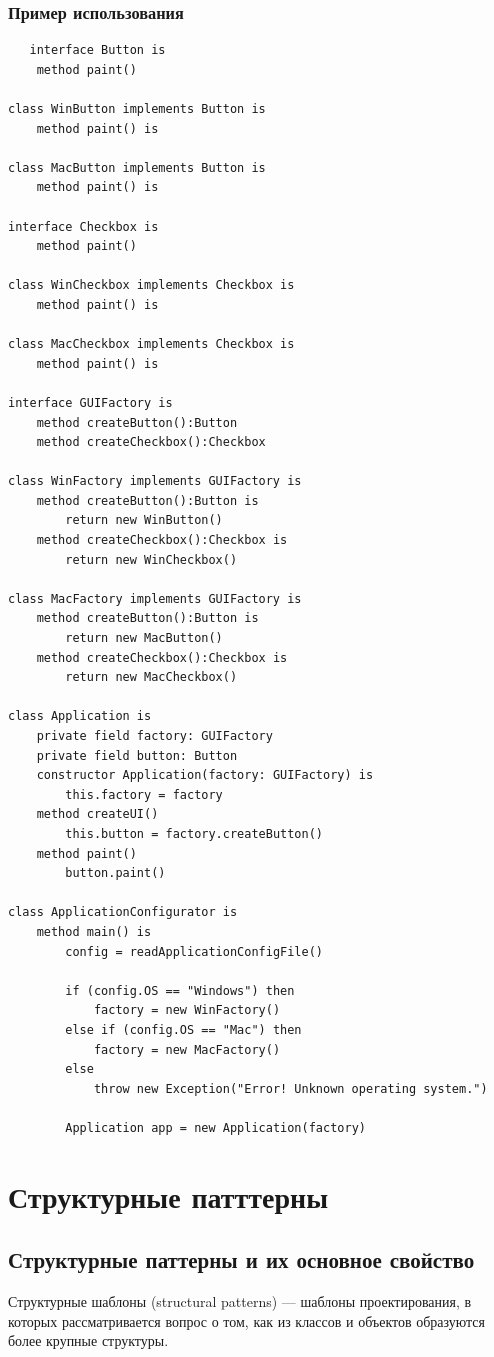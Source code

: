 \subsection{Пример использования}
\begin{lstlisting}
   interface Button is
    method paint()

class WinButton implements Button is
    method paint() is

class MacButton implements Button is
    method paint() is

interface Checkbox is
    method paint()

class WinCheckbox implements Checkbox is
    method paint() is

class MacCheckbox implements Checkbox is
    method paint() is

interface GUIFactory is
    method createButton():Button
    method createCheckbox():Checkbox

class WinFactory implements GUIFactory is
    method createButton():Button is
        return new WinButton()
    method createCheckbox():Checkbox is
        return new WinCheckbox()

class MacFactory implements GUIFactory is
    method createButton():Button is
        return new MacButton()
    method createCheckbox():Checkbox is
        return new MacCheckbox()

class Application is
    private field factory: GUIFactory
    private field button: Button
    constructor Application(factory: GUIFactory) is
        this.factory = factory
    method createUI()
        this.button = factory.createButton()
    method paint()
        button.paint()

class ApplicationConfigurator is
    method main() is
        config = readApplicationConfigFile()

        if (config.OS == "Windows") then
            factory = new WinFactory()
        else if (config.OS == "Mac") then
            factory = new MacFactory()
        else
            throw new Exception("Error! Unknown operating system.")

        Application app = new Application(factory)
\end{lstlisting}

\newpage
\chapter{Структурные патттерны}
\section{Структурные паттерны и их основное свойство}
Структурные шаблоны (structural patterns) — шаблоны проектирования, в которых рассматривается вопрос о том, как из классов и объектов образуются более крупные структуры.

